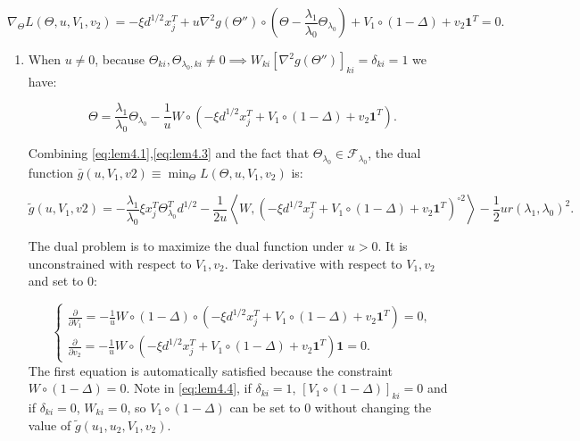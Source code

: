 \begin{equation}
    \label{eq:lem4.2}
    \nabla_\Theta L(\Theta,u,V_1,v_2)=-\xi d^{1/2}x_j^T+u\nabla^2g(\Theta'')\circ(\Theta-\frac{\lambda_1}{\lambda_0}\Theta_{\lambda_0})+V_1\circ(1-\Delta)+v_2\mathbf{1}^T=0.
\end{equation}

\begin{enumerate}
    \item When $u\neq 0$, because $\Theta_{ki},\Theta_{\lambda_0,ki}\neq0\implies W_{ki}[\nabla^2g(\Theta'')]_{ki}=\delta_{ki}=1$ we have:

\begin{equation}
    \label{eq:lem4.3}
    \Theta=\frac{\lambda_1}{\lambda_0}\Theta_{\lambda_0}-\frac{1}{u}W\circ\left(-\xi d^{1/2}x_j^T+V_1\circ(1-\Delta)+v_2\mathbf{1}^T\right).
\end{equation}

Combining \eqref{eq:lem4.1},\eqref{eq:lem4.3} and the fact that $\Theta_{\lambda_0}\in\mathcal{F}_{\lambda_0}$, the dual function $\bar{g}(u,V_1,v2)\equiv\min_\Theta L(\Theta,u,V_1,v_2)$ is:

\begin{equation}
    \label{eq:lem4.4}
    \tilde{g}(u,V_1,v2)=-\frac{\lambda_1}{\lambda_0}\xi x_j^T\Theta_{\lambda_0}^Td^{1/2}-\frac{1}{2u}\left\langle W,\left( -\xi d^{1/2} x_j^T+V_1\circ(1-\Delta)+v_2\mathbf{1}^T\right)^{\circ2}\right\rangle-\frac{1}{2}ur(\lambda_1,\lambda_0)^2.
\end{equation}

The dual problem is to maximize the dual function under $u> 0$. It is unconstrained with respect to $V_1,v_2$. Take derivative with respect to $V_1,v_2$ and set to 0:

\begin{equation}
    \label{eq:lem4.5}
    \begin{cases}
    \frac{\partial}{\partial V_1}=-\frac{1}{u}W\circ(1-\Delta)\circ\left(-\xi d^{1/2} x_j^T+V_1\circ(1-\Delta)+v_2\mathbf{1}^T\right)=0,\\
    \frac{\partial}{\partial v_2}=-\frac{1}{u}W\circ\left( -\xi d^{1/2} x_j^T+V_1\circ(1-\Delta)+v_2\mathbf{1}^T\right)\mathbf{1}=0.
    \end{cases}
\end{equation}
The first equation is automatically satisfied because the constraint $W\circ(1-\Delta)=0$. Note in \eqref{eq:lem4.4}, if $\delta_{ki}=1$, $[V_1\circ(1-\Delta)]_{ki}=0$ and if $\delta_{ki}=0$, $W_{ki}=0$, so $V_1\circ(1-\Delta)$ can be set to 0 without changing the value of $\tilde{g}(u_1,u_2,V_1,v_2)$.


\end{enumerate}
